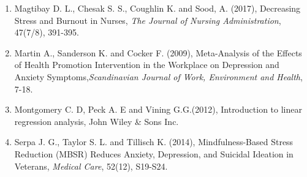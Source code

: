 \documentclass[12pt]{article}\usepackage[]{graphicx}\usepackage[]{xcolor}
\numberwithin{equation}{section}
\numberwithin{figure}{section}
\begin{document}
\begin{enumerate}
	
	\item Magtibay D. L., Chesak S. S., Coughlin K. and Sood, A. (2017), Decreasing Stress and Burnout in Nurses, \emph{The Journal of Nursing Administration}, 47(7/8), 391-395.
	
	\item Martin A., Sanderson K. and Cocker F. (2009), Meta-Analysis of the Effects of Health Promotion Intervention in the Workplace on Depression and Anxiety Symptoms,\emph{Scandinavian Journal of Work, Environment and Health}, 7-18.
	\item  Montgomery C. D, Peck A. E and Vining G.G.(2012), Introduction to linear regression analysis, John Wiley \& Sons Inc.
	\item Serpa J. G., Taylor S. L. and Tillisch K. (2014), Mindfulness-Based Stress Reduction (MBSR) Reduces Anxiety, Depression, and Suicidal Ideation in Veterans, \emph{Medical Care}, 52(12), S19-S24.
\end{enumerate}
\end{document}
